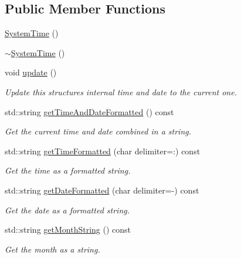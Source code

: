 \subsection*{Public Member Functions}
\begin{DoxyCompactItemize}
\item 
\mbox{\hyperlink{classec_1_1_system_time_ab37ecc2b60896c51db31e6272728a0ba}{System\+Time}} ()
\item 
\mbox{\hyperlink{classec_1_1_system_time_af227490217275ef710940bcd18569c6d}{$\sim$\+System\+Time}} ()
\item 
void \mbox{\hyperlink{classec_1_1_system_time_a2d16742bb2de689d907fff3ca0b2cfca}{update}} ()
\begin{DoxyCompactList}\small\item\em Update this structures internal time and date to the current one. \end{DoxyCompactList}\item 
std\+::string \mbox{\hyperlink{classec_1_1_system_time_a4b718dbc158199a39a0a8dc2b7034ace}{get\+Time\+And\+Date\+Formatted}} () const
\begin{DoxyCompactList}\small\item\em Get the current time and date combined in a string. \end{DoxyCompactList}\item 
std\+::string \mbox{\hyperlink{classec_1_1_system_time_aa66b5939fa20b202accd79ac150c4c1b}{get\+Time\+Formatted}} (char delimiter=\textquotesingle{}\+:\textquotesingle{}) const
\begin{DoxyCompactList}\small\item\em Get the time as a formatted string. \end{DoxyCompactList}\item 
std\+::string \mbox{\hyperlink{classec_1_1_system_time_a98c7e6d5cce91b572416c8780d7b9ca6}{get\+Date\+Formatted}} (char delimiter=\textquotesingle{}-\/\textquotesingle{}) const
\begin{DoxyCompactList}\small\item\em Get the date as a formatted string. \end{DoxyCompactList}\item 
std\+::string \mbox{\hyperlink{classec_1_1_system_time_a0ed364b6f606544c3317499878406347}{get\+Month\+String}} () const
\begin{DoxyCompactList}\small\item\em Get the month as a string. \end{DoxyCompactList}\item 

\end{DoxyCompactItemize}
